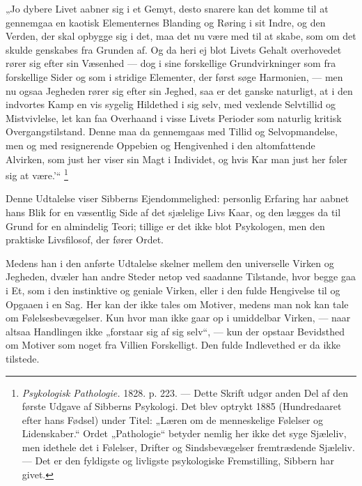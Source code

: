 \documentclass[12pt,a4paper,openany]{book}
\newcommand{\opage}[1]{\marginnote{\footnotesize\textit{[#1]}}}
\begin{document}
„Jo dybere Livet aabner sig i et Gemyt, desto snarere kan det komme til at
gennemgaa en kaotisk Elementernes Blanding og Røring i sit Indre, og den
Verden, der skal opbygge sig i det, maa det nu være med til at skabe, som om
det skulde genskabes fra Grunden af. Og da heri ej blot Livets Gehalt
overhovedet rører sig efter sin Væsenhed --- dog i sine forskellige
Grundvirkninger som fra forskellige Sider og som i stridige Elementer, der
først søge Harmonien, --- men nu ogsaa Jegheden rører sig efter sin Jeghed, saa
er det ganske naturligt, at i den indvortes Kamp en vis sygelig Hildethed i sig
selv, med vexlende Selvtillid og Mistvivlelse, let kan faa Overhaand i visse
Livets Perioder som naturlig kritisk Overgangstilstand. Denne maa da gennemgaas
med Tillid og Selvopmandelse, men og med resignerende Oppebien og Hengivenhed i
den altomfattende Alvirken, som just her viser sin Magt i Individet, og hvis
Kar man just her føler sig at være.'“%
\footnote[1]{\textit{Psykologisk Pathologie.} 1828. p. 223. --- Dette Skrift
udgør anden Del af den første Udgave af Sibberns Psykologi. Det blev optrykt
1885 (Hundredaaret efter hans Fødsel) under Titel: „Læren om de menneskelige
Følelser og Lidenskaber.“ Ordet „Pathologie“ betyder nemlig her ikke det syge
Sjæleliv, men idethele det i Følelser, Drifter og Sindsbevægelser fremtrædende
Sjæleliv. --- Det er den fyldigste og livligste psykologiske Fremstilling,
Sibbern har givet.}

Denne Udtalelse viser Sibberns Ejendommelighed: personlig Erfaring har aabnet
hans Blik for en væsentlig Side af det sjælelige Livs Kaar, og den lægges da
til Grund for en almindelig Teori; tillige er det ikke blot Psykologen, men den
praktiske Livsfilosof, der fører Ordet.

\setcounter{footnote}{0}%
\opage{102}Medens han i den anførte Udtalelse skelner mellem den universelle
Virken og Jegheden, dvæler han andre Steder netop ved saadanne Tilstande, hvor
begge gaa i Et, som i den instinktive og geniale Virken, eller i den fulde
Hengivelse til og Opgaaen i en Sag. Her kan der ikke tales om Motiver, medens
man nok kan tale om Følelsesbevægelser. Kun hvor man ikke gaar op i umiddelbar
Virken, --- naar altsaa Handlingen ikke „forstaar sig af sig selv“, --- kun der
opstaar Bevidsthed om Motiver som noget fra Villien Forskelligt. Den fulde
Indlevethed er da ikke tilstede.
\end{document}
